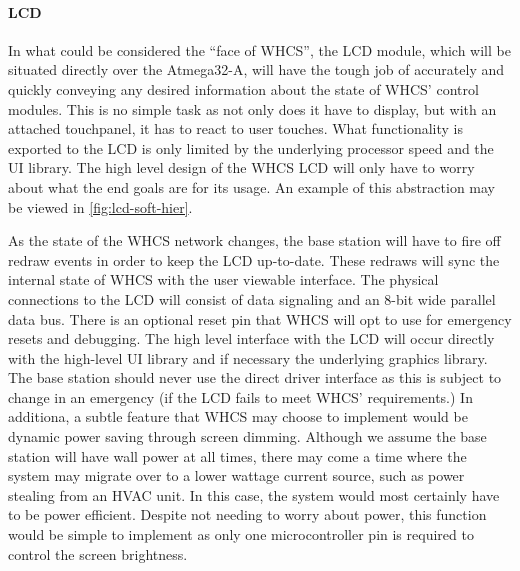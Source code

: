 \paragraph{LCD}
In what could be considered the ``face of WHCS'', the LCD module, which will be
situated directly over the Atmega32-A, will have the tough job of accurately
and quickly conveying any desired information about the state of WHCS' control
modules. This is no simple task as not only does it have to display, but with
an attached touchpanel, it has to react to user touches. What functionality is
exported to the LCD is only limited by the underlying processor speed and the
UI library. The high level design of the WHCS LCD will only have to worry about
what the end goals are for its usage. An example of this abstraction may be
viewed in \autoref{fig:lcd-soft-hier}.


As the state of the WHCS network changes, the base station will have to fire
off redraw events in order to keep the LCD up-to-date. These redraws will sync
the internal state of WHCS with the user viewable interface. The physical
connections to the LCD will consist of data signaling and an 8-bit wide
parallel data bus. There is an optional reset pin that WHCS will opt to use for
emergency resets and debugging. The high level interface with the LCD will
occur directly with the high-level UI library and if necessary the underlying
graphics library. The base station should never use the direct driver interface
as this is subject to change in an emergency (if the LCD fails to meet WHCS'
requirements.) In additiona, a subtle feature that WHCS may choose to implement would be
dynamic power saving through screen dimming. Although we assume the base
station will have wall power at all times, there may come a time where the
system may migrate over to a lower wattage current source, such as power
stealing from an HVAC unit. In this case, the system would most certainly have
to be power efficient. Despite not needing to worry about power, this function
would be simple to implement as only one microcontroller pin is required to
control the screen brightness.

